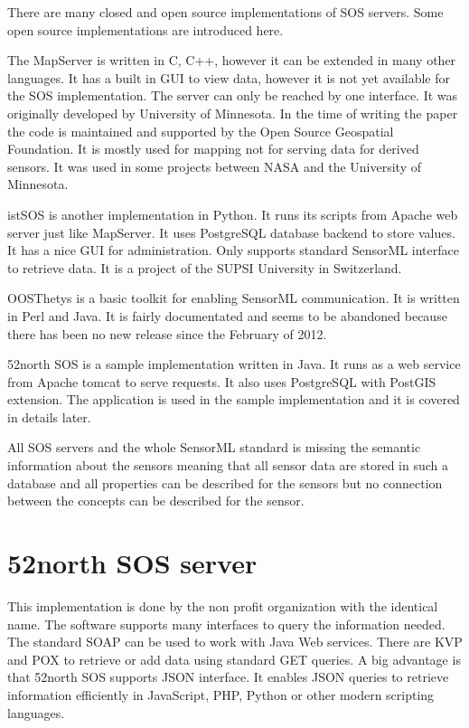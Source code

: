 There are many closed and open source implementations of SOS servers. Some open source implementations are introduced here.

The MapServer is written in C, C++, however it can be extended in many other languages\cite{mapserver}. It has a built in GUI to view data, however it is not yet available for the SOS implementation. The server can only be reached by one interface. It was originally developed by University of Minnesota. In the time of writing the paper the code is maintained and supported by the Open Source Geospatial Foundation. It is mostly used for mapping not for serving data for derived sensors. It was used in some projects between NASA and the University of Minnesota. 

istSOS is another implementation in Python\cite{istsos}. It runs its scripts from Apache web server just like MapServer. It uses PostgreSQL database backend to store values. It has a nice GUI for administration. Only supports standard SensorML interface to retrieve data. It is a project of the SUPSI University in Switzerland.

OOSThetys is a basic toolkit for enabling SensorML communication. It is written in Perl and Java. It is fairly documentated and seems to be abandoned because there has been no new release since the February of 2012.

52north SOS is a sample implementation written in Java\cite{52north}. It runs as a web service from Apache tomcat to serve requests. It also uses PostgreSQL with PostGIS extension. The application is used in the sample implementation and it is covered in details later.

All SOS servers and the whole SensorML standard is missing the semantic information about the sensors meaning that all sensor data are stored in such a database and all properties can be described for the sensors but no connection between the concepts can be described for the sensor.

\section{52north SOS server}

This implementation is done by the non profit organization with the identical name. The software supports many interfaces to query the information needed. The standard SOAP can be used to work with Java Web services. There are KVP and POX to retrieve or add data using standard GET queries. A big advantage is that 52north SOS supports JSON interface. It enables JSON queries to retrieve information efficiently in JavaScript, PHP, Python or other modern scripting languages.

